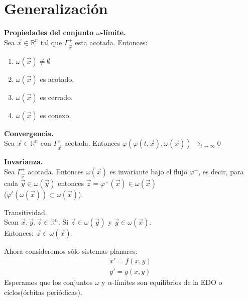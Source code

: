 
\chapter{Generalización}
\begin{lemma}
	\textbf{Propiedades del conjunto $\omega$-límite.}\\
	Sea $\vec{x}\in\mathbb{R}^n$ tal que $\varGamma_{\vec{x}}^{+}$ esta acotada. Entonces:
	\begin{enumerate}
		\item $\omega(\vec{x})\neq\emptyset$
		\item $\omega(\vec{x})$ es acotado.
		\item $\omega(\vec{x})$ es cerrado.
		\item $\omega(\vec{x})$ es conexo.
	\end{enumerate}
\end{lemma}

\begin{lemma}
	\textbf{Convergencia.}\\
	Sea $\vec{x}\in\mathbb{R}^n$ con $\varGamma_{\vec{x}}^{+}$ acotada. Entonces $\varphi(\varphi(t,\vec{x}),\omega(\vec{x}))\to_{t\to\infty}0$
\end{lemma}

\begin{lemma}
	\textbf{Invarianza.}\\
	Sea $\varGamma_{\vec{x}}^{+}$ acotada. Entonces $\omega(\vec{x})$ es invariante bajo el flujo $\varphi^+$, es decir, para cada $\vec{y}\in\omega(\vec{y})$
	entonces $\vec{z}=\varphi^+(\vec{x})\in\omega(\vec{x})$ \\ ($\varphi^t(\omega(\vec{x}))\subset\omega(\vec{x})$).
\end{lemma}

\begin{lemma}
	Transitividad.\\
	Sean $\vec{x},\vec{y},\vec{z}\in\mathbb{R}^n$. Si $\vec{z}\in\omega(\vec{y})$ y $\vec{y}\in\omega(\vec{x})$.
	\\ Entonces: $\vec{z}\in\omega(\vec{x})$.
\end{lemma}

Ahora consideremos sólo sistemas planares:
\begin{eqnarray}
	x'=f(x,y) \\
	y'=g(x,y)
\end{eqnarray}
Esperamos que los conjuntos $\omega$ y $\alpha$-límites son equilibrios de la EDO o cíclos(órbitas periódicas).

